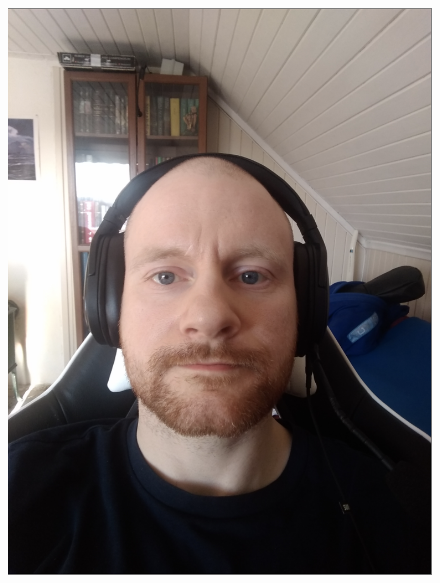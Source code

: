 \begin{figure}[h]
\centering
    \subfloat
        {\includegraphics[scale = 0.2]{figures/0368.png}\hspace{0.4cm}}
    \subfloat

\end{figure}

